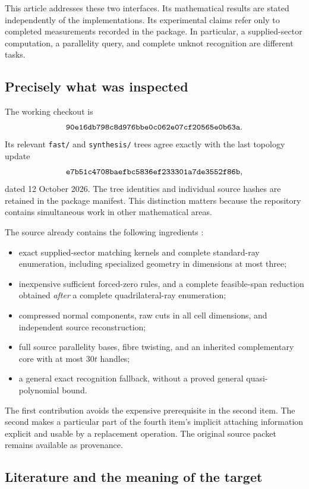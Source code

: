 \documentclass[11pt]{article}
\theoremstyle{definition}
\theoremstyle{remark}
\newcommand{\code}[1]{\texttt{#1}}
\begin{document}
This article addresses these two interfaces. Its mathematical results
are stated independently of the implementations. Its experimental claims
refer only to completed measurements recorded in the package. In
particular, a supplied-sector computation, a parallelity query, and complete
unknot recognition are different tasks.

\subsection{Precisely what was inspected}

The working checkout is
\[
\text{\code{90e16db798c8d976bbe0c062e07cf20565e0b63a}}.
\]
Its relevant \code{fast/} and \code{synthesis/} trees agree exactly with the
last topology update
\[
\text{\code{e7b51c4708baefbc5836ef233301a7de3552f86b}},
\]
dated 12 October 2026. The tree identities and individual source hashes are
retained in the package manifest. This distinction matters because the
repository contains simultaneous work in other mathematical areas.

The source already contains the following ingredients
\cite{repo}:
\begin{itemize}
\item exact supplied-sector matching kernels and complete standard-ray
enumeration, including specialized geometry in dimensions at most three;
\item inexpensive sufficient forced-zero rules, and a complete feasible-span
reduction obtained \emph{after} a complete quadrilateral-ray enumeration;
\item compressed normal components, raw cuts in all cell dimensions, and
independent source reconstruction;
\item full source parallelity bases, fibre twisting, and an inherited
complementary core with at most \(30t\) handles;
\item a general exact recognition fallback, without a proved general
quasi-polynomial bound.
\end{itemize}

The first contribution avoids the expensive prerequisite in the second
item. The second makes a particular part of the fourth item's implicit
attaching information explicit and usable by a replacement operation.
The original source packet remains available as provenance.

\subsection{Literature and the meaning of the target}
\end{document}
